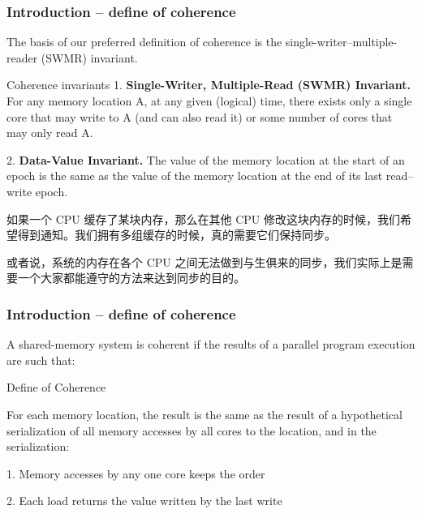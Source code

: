 \begin{frame}[plain]
	\frametitle{Introduction -- define of coherence}
	The basis of our preferred definition of coherence is the single-writer–multiple-reader (SWMR)
	invariant. 
	
	\begin{block}{Coherence invariants}
	1. \textbf{Single-Writer, Multiple-Read (SWMR) Invariant.} For any memory location A, at any
	given (logical) time, there exists only a single core that may write to A (and can also read it)
	or some number of cores that may only read A.
	
	2.  \textbf{Data-Value Invariant.} The value of the memory location at the start of an epoch is the same
	as the value of the memory location at the end of its last read–write epoch.
	
\end{block}
\pause
如果一个 CPU 缓存了某块内存，那么在其他 CPU 修改这块内存的时候，我们希望得到通知。我们拥有多组缓存的时候，真的需要它们保持同步。

或者说，系统的内存在各个 CPU 之间无法做到与生俱来的同步，我们实际上是需要一个大家都能遵守的方法来达到同步的目的。

\end{frame}


\begin{frame}[plain]
	\frametitle{Introduction -- define of coherence}
	
	A shared-memory system is coherent if the results of a parallel program
	execution are such that:
	\begin{block}{Define of Coherence}

		
		For each memory location, the result is the same as the result of a
		hypothetical serialization of all memory accesses by all cores to the
		location, and in the serialization:
		
		1. Memory accesses by any one core keeps the order
		
		
		2. Each load returns the value written by the last write
		
		
	\end{block}
	

	
\end{frame}



